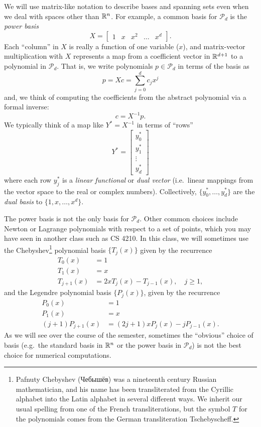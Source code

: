 \documentclass[12pt, leqno]{article}
\begin{document}
We will use matrix-like notation to describe bases and spanning sets
even when we deal with spaces other than $\mathbb{R}^n$.  For example, a
common basis for $\mathcal{P}_d$ is the {\em power basis}
\[
  X = \begin{bmatrix} 1 & x & x^2 & \ldots & x^d \end{bmatrix}.
\]
Each ``column'' in $X$ is really a function of one variable ($x$), and
matrix-vector multiplication with $X$ represents a map from a
coefficient vector in $\mathbb{R}^{d+1}$ to a polynomial in $\mathcal{P}_d$.
That is, we write polynomials $p \in \mathcal{P}_d$ in terms of the
basis as
\[
  p = Xc = \sum_{j=0}^d c_j x^j
\]
and, we think of computing the coefficients from the
abstract polynomial via a formal inverse:
\[
  c = X^{-1} p.
\]
We typically think of a map like $Y^* = X^{-1}$ in terms of ``rows''
\[
  Y^* = \begin{bmatrix} y_0^* \\ y_1^* \\ \vdots \\ y_d^* \end{bmatrix}
\]
where each row $y_j^*$ is a {\em linear functional} or {\em dual
  vector} (i.e.~linear mappings from the vector space to the real or
complex numbers).  Collectively, $\{y_0^*, \ldots, y_d^*\}$ are the
{\em dual basis} to $\{1, x, \ldots, x^d\}$.

The power basis is not the only basis for $\mathcal{P}_d$.  Other
common choices include Newton or Lagrange polynomials with respect to
a set of points, which you may have seen in another class such as CS
4210.  In this class, we will sometimes use the Chebyshev\footnote{
  Pafnuty Chebyshev (Чебышёв) was a nineteenth century Russian
  mathematician, and his name has been transliterated from the
  Cyrillic alphabet into the Latin alphabet in several different ways.
  We inherit our usual spelling from one of the French
  transliterations, but the symbol $T$ for the polynomials comes from
  the German transliteration Tschebyscheff.  } polynomial basis $\{
T_j(x) \}$ given by the recurrence
\begin{align*}
  T_0(x) &= 1 \\
  T_1(x) &= x \\
  T_{j+1}(x) &= 2 x T_{j}(x) - T_{j-1}(x), \quad j \geq 1,
\end{align*}
and the Legendre polynomial basis
$\{ P_j(x) \}$, given by the recurrence
\begin{align*}
  P_0(x) &= 1 \\
  P_1(x) &= x \\
  (j+1) P_{j+1}(x) &= (2j+1) x P_j(x) - j P_{j-1}(x).
\end{align*}
As we will see over the course of the semester, sometimes the
``obvious'' choice of basis (e.g.~the standard basis in $\mathbb{R}^n$ or
the power basis in $\mathcal{P}_d$) is not the best choice for
numerical computations.
\end{document}
